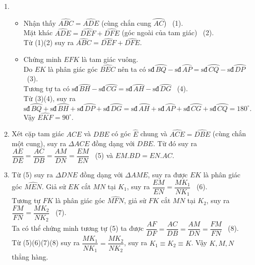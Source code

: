 \begin{ex}
{\begin{center}
    \end{center}
    \begin{enumerate}
        \item 
        \begin{itemize}
        \item Nhận thấy $\widehat{ABC}=\widehat{ADE}$ (cùng chắn cung $\wideparen{AC}$) \ (1).\\
        Mặt khác $\widehat{ADE}=\widehat{DEF}+\widehat{DFE}$ (góc ngoài của tam giác) \ (2).\\
        Từ (1)(2) suy ra $\widehat{ABC}=\widehat{DEF}+\widehat{DFE}$.
        \item Chứng minh $EFK$ là tam giác vuông.\\
        Do $EK$ là phân giác góc $\widehat{BEC}$ nên ta có $\mbox{sđ}\,\wideparen{BQ}-\mbox{sđ}\,\wideparen{AP}=\mbox{sđ}\,\wideparen{CQ}-\mbox{sđ}\,\wideparen{DP}$ \ (3).\\
        Tương tự ta có $\mbox{sđ}\,\wideparen{BH}-\mbox{sđ}\,\wideparen{CG}=\mbox{sđ}\,\wideparen{AH}-\mbox{sđ}\,\wideparen{DG}$ \ (4).\\
        Từ (3)(4), suy ra $$\mbox{sđ}\,\wideparen{BQ}+\mbox{sđ}\,\wideparen{BH}+\mbox{sđ}\,\wideparen{DP}+\mbox{sđ}\,\wideparen{DG}=\mbox{sđ}\,\wideparen{AH}+\mbox{sđ}\,\wideparen{AP}+\mbox{sđ}\,\wideparen{CG}+\mbox{sđ}\,\wideparen{CQ}=180^\circ.$$
        Vậy $\widehat{EKF}=90^\circ$.
        \end{itemize}
        \item Xét cặp tam giác $ACE$ và $DBE$ có góc $\widehat{E}$ chung và $\widehat{ACE}=\widehat{DBE}$ (cùng chắn một cung), suy ra $\Delta ACE$ đồng dạng với $DBE$. Từ đó suy ra $\dfrac{AE}{DE}=\dfrac{AC}{DB}=\dfrac{AM}{DN}=\dfrac{EM}{EN}$ \ (5) và $EM.BD=EN.AC$.
        \item Từ (5) suy ra $\Delta DNE$ đồng dạng với $\Delta AME$, suy ra được $EK$ là phân giác góc $\widehat{MEN}$. Giả sử $EK$ cắt $MN$ tại $K_1$, suy ra $\dfrac{EM}{EN}=\dfrac{MK_1}{NK_1}$ \ (6). \\
        Tương tự $FK$ là phân giác góc $\widehat{MFN}$, giả sử $FK$ cắt $MN$ tại $K_2$, suy ra $\dfrac{FM}{FN}=\dfrac{MK_2}{NK_2}$ \ (7). \\
        Ta có thể chứng minh tương tự (5) ta được $\dfrac{AF}{DF}=\dfrac{AC}{DB}=\dfrac{AM}{DN}=\dfrac{FM}{FN}$ \ (8).\\
        Từ (5)(6)(7)(8) suy ra $\dfrac{MK_1}{NK_1}=\dfrac{MK_2}{NK_2}$, suy ra $K_1\equiv K_2\equiv K$. Vậy $K,M,N$ thẳng hàng.
    \end{enumerate}
    }
\end{ex}

